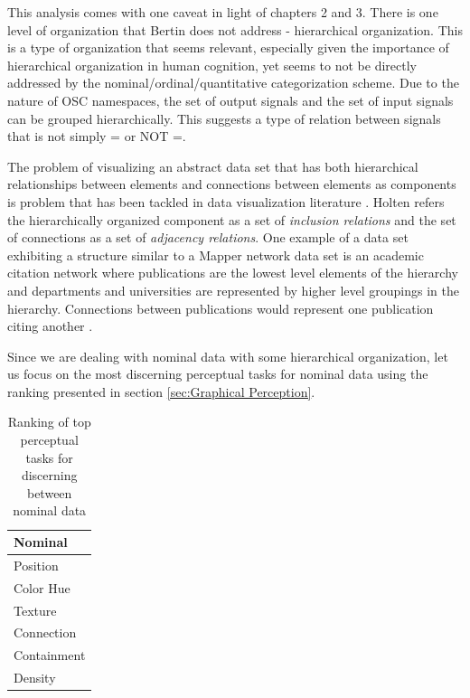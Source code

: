 This analysis comes with one caveat in light of chapters 2 and 3. There is one level of organization that Bertin does not address - hierarchical organization. This is a type of organization that seems relevant, especially given the importance of hierarchical organization in human cognition, yet seems to not be directly addressed by the nominal/ordinal/quantitative categorization scheme. Due to the nature of OSC namespaces, the set of output signals and the set of input signals can be grouped hierarchically. This suggests a type of relation between signals that is not simply = or NOT =.

The problem of visualizing an abstract data set that has both hierarchical relationships between elements and connections between elements as components is problem that has been tackled in data visualization literature \cite{edgebundles2006}. Holten refers the hierarchically organized component as a set of \emph{inclusion relations} and the set of connections as a set of \emph{adjacency relations}. One example of a data set exhibiting a structure similar to a Mapper network data set is an academic citation network where publications are the lowest level elements of the hierarchy and departments and universities are represented by higher level groupings in the hierarchy. Connections between publications would represent one publication citing another \cite{edgebundles2006}.

Since we are dealing with nominal data with some hierarchical organization, let us focus on the most discerning perceptual tasks for nominal data using the ranking presented in section \ref{sec:Graphical Perception}.

\begin{table}
    \begin{center}
    \begin{tabular}{ | l | }
    \hline
    Nominal \\ \hline
    Position \\
    Color Hue \\
    Texture \\
    Connection \\
    Containment \\
    Density \\
    \hline
    \end{tabular}
    \end{center}
    \caption{Ranking of top perceptual tasks for discerning between nominal data \cite{jock1986}}
    \label{tab:perceptualNominal}
\end{table}

